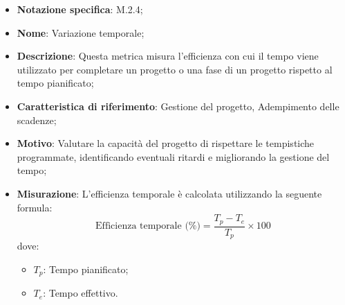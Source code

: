 \begin{itemize}
    \item \textbf{Notazione specifica}: M.2.4;
    \item \textbf{Nome}: Variazione temporale;
    \item \textbf{Descrizione}: Questa metrica misura l'efficienza con cui il tempo viene utilizzato per completare un progetto o una fase di un progetto rispetto al tempo pianificato;
    \item \textbf{Caratteristica di riferimento}: Gestione del progetto, Adempimento delle scadenze;
    \item \textbf{Motivo}: Valutare la capacità del progetto di rispettare le tempistiche programmate, identificando eventuali ritardi e migliorando la gestione del tempo;
    \item \textbf{Misurazione}: L'efficienza temporale è calcolata utilizzando la seguente formula:
    \[
        \text{Efficienza temporale (\%)} =\frac{T_p - T_e}{T_p} \times 100
    \]
    dove:
    \begin{itemize}
        \item $T_{p}$: Tempo pianificato;
        \item $T_{e}$: Tempo effettivo.
    \end{itemize}
\end{itemize}
